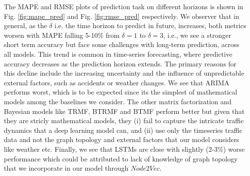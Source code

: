 The MAPE and RMSE plots of prediction task on different horizons is shown in Fig. \ref{fig:mape_pred} and Fig. \ref{fig:rmse_pred} respectively. We observer that in general, as the $\delta$ i.e. the time horizon to predict in future, increases, both metrics worsen with MAPE falling 5-10\% from $\delta=1$ to $\delta=3$, i.e., we see a stronger short term accuracy but face some challenges with long-term prediction, across all models. This trend is common in time-series forecasting, where predictive accuracy decreases as the prediction horizon extends. The primary reasons for this decline include the increasing uncertainty and the influence of unpredictable external factors, such as accidents or weather changes. We see that ARIMA performs worst, which is to be expected since its the simplest of mathematical models among the baselines we consider. The other matrix factorization and Bayesian models like TRMF, BTRMF and BTMF perform better but given that they are stricly mathematical models, they (i) fail to capture the intricate traffic dynamics that a deep learning model can, and (ii) use only the timeseries traffic data and not the graph topology and external factors that our model considers like weather etc. Finally, we see that LSTMs are close with slightly (2-3\%) worse performance which could be attributed to lack of knowledge of graph topology that we incorporate in our model through $Node2Vec$.

